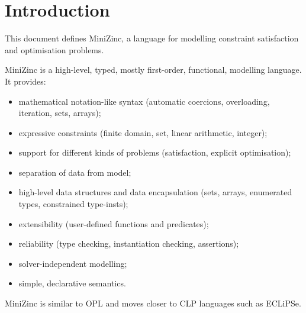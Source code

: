 \documentclass[10pt]{scrartcl}
\begin{document}
\newcommand{\RuleWarnings}{
\production{warnings}
    \oneOrMore{\nt{message}}
}

\newcommand{\RuleMessage}{
\production{message}
    \oneOrMore{\nt{line}} \\

\production{line}
    \texttt{\%} 
    \regexp{[\carat{}\backsl{}n]*} ~\nl
}

\setcounter{tocdepth}{2}

\pagebreak
\tableofcontents
\pagebreak

\section{Introduction}
This document defines MiniZinc, a language for modelling constraint
satisfaction and optimisation problems.

MiniZinc is a high-level, typed, mostly first-order, functional, modelling
language.  It provides:
\begin{itemize}
\item mathematical notation-like syntax (automatic coercions, overloading,
      iteration, sets, arrays);
\item expressive constraints (finite domain, set, linear arithmetic, integer);
\item support for different kinds of problems (satisfaction, explicit
      optimisation);
\item separation of data from model;
\item high-level data structures and data encapsulation (sets,
      arrays, enumerated types, constrained type-insts);
\item extensibility (user-defined functions and predicates);
\item reliability (type checking, instantiation checking, assertions);
\item solver-independent modelling;
\item simple, declarative semantics.
\end{itemize}
MiniZinc is similar to 
OPL and moves closer to CLP languages such as ECLiPSe.
\end{document}
